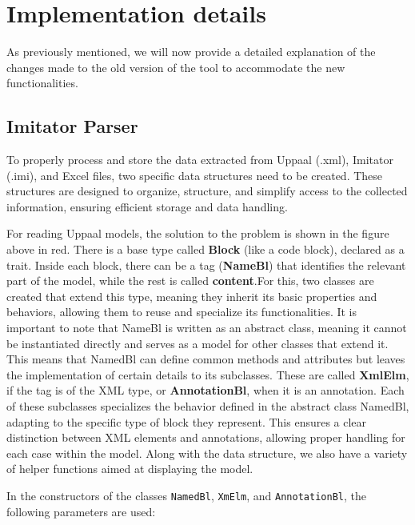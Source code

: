 \section{Implementation details}
As previously mentioned, we will now provide a detailed explanation of the changes made to the old version of the tool to accommodate the new functionalities.
\subsection{Imitator Parser}

To properly process and store the data extracted from Uppaal (.xml), Imitator (.imi), and Excel files, two specific data structures need to be created. These structures are designed to organize, structure, and simplify access to the collected information, ensuring efficient storage and data handling.

For reading Uppaal models, the solution to the problem is shown in the figure above in red. There is a base type called \textbf{Block} (like a code block), declared as a trait. Inside each block, there can be a tag (\textbf{NameBl}) that identifies the relevant part of the model, while the rest is called \textbf{content}.For this, two classes are created that extend this type, meaning they inherit its basic properties and behaviors, allowing them to reuse and specialize its functionalities. It is important to note that NameBl is written as an abstract class, meaning it cannot be instantiated directly and serves as a model for other classes that extend it. This means that NamedBl can define common methods and attributes but leaves the implementation of certain details to its subclasses. These are called \textbf{XmlElm}, if the tag is of the XML type, or \textbf{AnnotationBl}, when it is an annotation. Each of these subclasses specializes the behavior defined in the abstract class NamedBl, adapting to the specific type of block they represent. This ensures a clear distinction between XML elements and annotations, allowing proper handling for each case within the model. Along with the data structure, we also have a variety of helper functions aimed at displaying the model. 

In the constructors of the classes \texttt{NamedBl}, \texttt{XmElm}, and \texttt{AnnotationBl}, the following parameters are used:  

